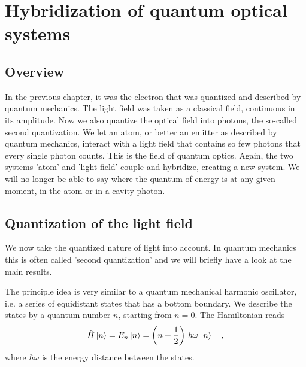 \renewcommand{\lastmod}{November 25, 2024}
\renewcommand{\chapterauthors}{Markus Lippitz}


\chapter{Hybridization of quantum optical systems}





\section{Overview}

In the previous chapter, it was the electron that was quantized and described by quantum mechanics. The light field was taken as a classical field, continuous in its amplitude. Now we also quantize the optical field into photons, the so-called second quantization. We let an atom, or better an emitter as described by quantum mechanics, interact with a light field that contains so few photons that every single photon counts. This is the field of quantum optics. Again, the two systems 'atom' and 'light field' couple and hybridize, creating a new system. We will no longer be able to say where the quantum of energy is at any given moment, in the atom or in a cavity photon.





\section{Quantization of the light field}
We now  take the quantized nature of light into account. In quantum mechanics this is often called 'second quantization' and we will briefly have a look at the main results.

The principle idea is very similar to a quantum mechanical harmonic oscillator, i.e. a series of equidistant states that has a bottom boundary. We describe the states by a quantum number $n$, starting from $n=0$. The Hamiltonian reads
\begin{equation}
\hat{H} \ket{n} = E_n \ket{n} = \left( n + \frac{1}{2} \right) \, \hbar \omega \, \ket{n} \quad ,
\end{equation}
where $\hbar \omega$ is the energy distance between the states.


